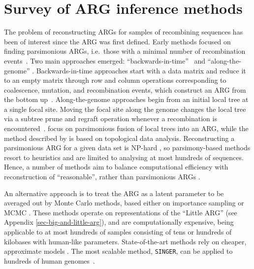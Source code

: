 \documentclass{article}
\begin{document}
\section{Survey of ARG inference methods}
\label{sec-survey-arg-infer}
The problem of reconstructing ARGs for samples of recombining sequences has
been of interest since the ARG was first defined. Early methods focused on
finding parsimonious ARGs, i.e.\ those with a minimal number of
recombination events~\citep{hein1990reconstructing}. Two main approaches
emerged: ``backwards-in-time''~\citep{lyngso2005minimum} and
``along-the-genome'' \citep{song2003parsimonious, song2005constructing}.
Backwards-in-time approaches
start with a data matrix and reduce it to an empty matrix through row
and column operations corresponding to coalescence, mutation, and recombination
events, which construct an ARG from the bottom up~\citep{song2005efficient,
wu2008association,thao2019hybrid,ignatieva2021kwarg}.
Along-the-genome approaches
begin from an initial local tree at a single focal site.
Moving the focal site along the
genome changes the local tree via a subtree prune and regraft
operation whenever a recombination is encountered~\citep{hein1993heuristic,
wu2011new, mirzaei2017rent}.
\citet{rasmussen2022espalier} focus on parsimonious fusion of local
trees into an ARG, while the method described by
\citet{camara2016inference} is based on topological data analysis.
Reconstructing a parsimonious ARG for a given data set is NP-hard
\citep{wang2001perfect}, so parsimony-based methods resort to heuristics and
are limited to analysing at most hundreds of sequences. Hence, a number of
methods aim to balance computational efficiency with reconstruction of
``reasonable'', rather than parsimonious ARGs
\citep{minichiello2006mapping,
parida2008estimating, kelleher2019inferring,  speidel2019method,
schaefer2021ancestral, zhang2023biobank}.


An alternative approach is to treat the ARG as a latent parameter to be
averaged out by Monte Carlo methods, based either on importance sampling
\citep{griffiths1996ancestral, fearnhead2001estimating, jenkins2011inference}
or MCMC \citep{kuhner2000maximum, kuhner2006lamarc, nielsen2000estimation, wang2008bayesian,
wang2009population, fallon2013acg, vaughan2017inferring, mahmoudi2022bayesian}.
These methods operate on representations
of the ``Little ARG'' (see Appendix \ref{sec-big-and-little-arg}), and are computationally expensive, being
applicable to at most hundreds of samples consisting of tens or hundreds of
kilobases with human-like parameters.
State-of-the-art methods rely on cheaper,
approximate models \citep{didelot2010inference, heine2018bridging,
hubisz2020mapping,hubisz2020inference, medina2020speeding,deng2024robust}. 
The most scalable
method, \texttt{SINGER}, can be applied to
hundreds of human genomes~\citep{deng2024robust}.
\end{document}
